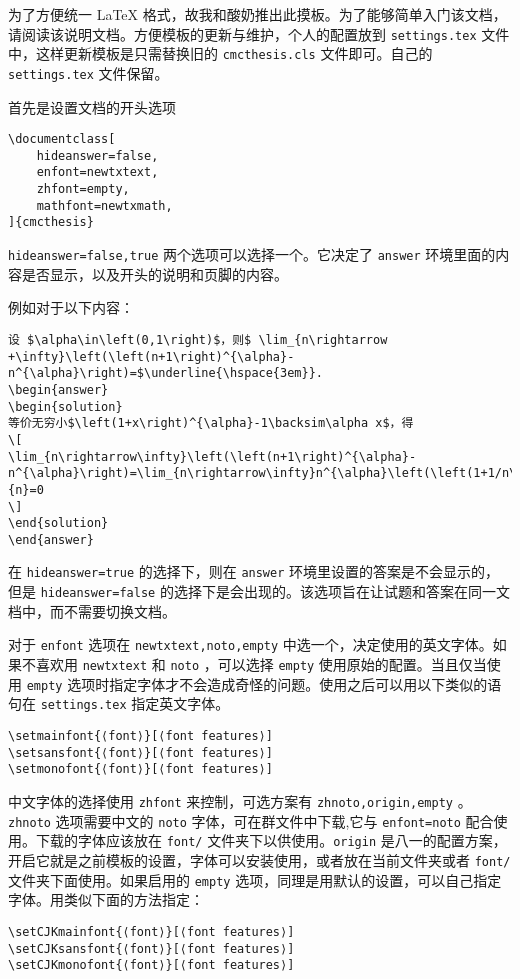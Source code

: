 \documentclass[hideanswer=false,
enfont=newtxtext,
zhfont=empty,
mathfont=newtxmath,
]{cmcthesis}
\begin{document}
	
\addvspace{1\bigskipamount}

为了方便统一 \LaTeX{} 格式，故我和酸奶推出此摸板。为了能够简单入门该文档，请阅读该说明文档。方便模板的更新与维护，个人的配置放到 \verb|settings.tex| 文件中，这样更新模板是只需替换旧的 \verb|cmcthesis.cls| 文件即可。自己的 \verb|settings.tex| 文件保留。

首先是设置文档的开头选项
\begin{lstlisting}[style=tex]
\documentclass[
	hideanswer=false,
	enfont=newtxtext,
	zhfont=empty,
	mathfont=newtxmath,
]{cmcthesis}
\end{lstlisting}
\verb|hideanswer=false,true| 两个选项可以选择一个。它决定了 \verb|answer| 环境里面的内容是否显示，以及开头的说明和页脚的内容。

例如对于以下内容：
\begin{lstlisting}[style=tex]
设 $\alpha\in\left(0,1\right)$，则$ \lim_{n\rightarrow +\infty}\left(\left(n+1\right)^{\alpha}-n^{\alpha}\right)=$\underline{\hspace{3em}}.
\begin{answer}
\begin{solution}
等价无穷小$\left(1+x\right)^{\alpha}-1\backsim\alpha x$，得
\[
\lim_{n\rightarrow\infty}\left(\left(n+1\right)^{\alpha}-n^{\alpha}\right)=\lim_{n\rightarrow\infty}n^{\alpha}\left(\left(1+1/n\right)^{\alpha}-1\right)=\lim_{n\rightarrow\infty}n^{\alpha}\times\frac{\alpha}{n}=0
\]
\end{solution}
\end{answer}
\end{lstlisting}
在 \verb|hideanswer=true| 的选择下，则在 \verb|answer| 环境里设置的答案是不会显示的，但是 \verb|hideanswer=false| 的选择下是会出现的。该选项旨在让试题和答案在同一文档中，而不需要切换文档。

对于 \verb|enfont| 选项在 \verb|newtxtext,noto,empty| 中选一个，决定使用的英文字体。如果不喜欢用 \verb|newtxtext| 和 \verb|noto| ，可以选择 \verb|empty| 使用原始的配置。当且仅当使用 \verb|empty| 选项时指定字体才不会造成奇怪的问题。使用之后可以用以下类似的语句在 \verb|settings.tex| 指定英文字体。
\begin{lstlisting}[style=tex]
\setmainfont{⟨font⟩}[⟨font features⟩]
\setsansfont{⟨font⟩}[⟨font features⟩]
\setmonofont{⟨font⟩}[⟨font features⟩]
\end{lstlisting}

中文字体的选择使用 \verb|zhfont| 来控制，可选方案有 \verb|zhnoto,origin,empty| 。\verb|zhnoto| 选项需要中文的 \verb|noto| 字体，可在群文件中下载,它与 \verb|enfont=noto| 配合使用。下载的字体应该放在 \verb|font/| 文件夹下以供使用。\verb|origin| 是八一的配置方案，开启它就是之前模板的设置，字体可以安装使用，或者放在当前文件夹或者 \verb|font/| 文件夹下面使用。如果启用的 \verb|empty| 选项，同理是用默认的设置，可以自己指定字体。用类似下面的方法指定：
\begin{lstlisting}[style=tex]
\setCJKmainfont{⟨font⟩}[⟨font features⟩]
\setCJKsansfont{⟨font⟩}[⟨font features⟩]
\setCJKmonofont{⟨font⟩}[⟨font features⟩]
\end{lstlisting}
\end{document}
